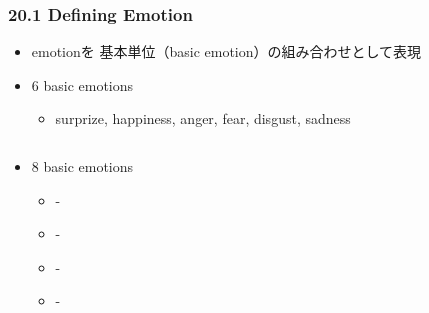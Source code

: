\begin{frame}
    \frametitle{20.1 Defining Emotion}
    \begin{itemize}
        \item emotionを 基本単位（basic emotion）の組み合わせとして表現
    \end{itemize}
    \begin{itemize}
        \item 6 basic emotions 
        \begin{itemize}
            \item surprize, happiness, anger, fear, disgust, sadness
        \end{itemize}
    \end{itemize}
    \begin{columns}
        \begin{column}[T]{0.5\textwidth}
            \begin{itemize}
                \item 8 basic emotions 
                \begin{itemize}
                    \item {} - 
                    \item {} - 
                    \item {} - 
                    \item {} - 
                \end{itemize}
            \end{itemize}
        \end{column}
        \begin{column}[T]{0.5\textwidth}
        \end{column}
    \end{columns}
\end{frame}


